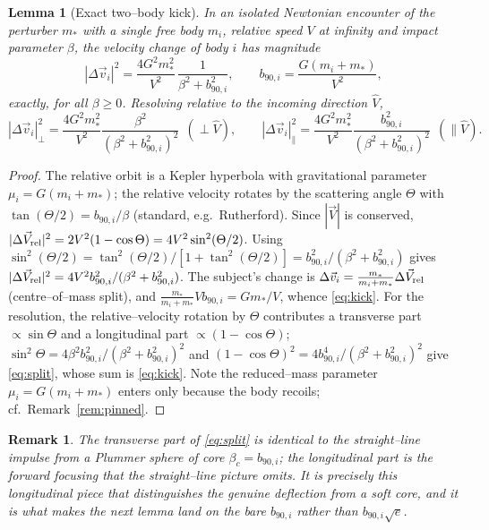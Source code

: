 \documentclass[11pt]{article}
\newcommand{\Vh}{\hat V}
\newtheorem{lemma}{Lemma}
\newtheorem{remark}{Remark}
\begin{document}
\begin{lemma}[Exact two--body kick]
\label{lem:kick}
In an isolated Newtonian encounter of the perturber $m_*$ with a single free body $m_i$, relative
speed $V$ at infinity and impact parameter $\beta$, the velocity change of body $i$ has magnitude
\begin{equation}
  |\Delta\vec v_i|^2=\frac{4G^2m_*^2}{V^2}\,\frac{1}{\beta^2+b_{90,i}^2},\qquad b_{90,i}=\frac{G(m_i+m_*)}{V^2},
  \label{eq:kick}
\end{equation}
exactly, for all $\beta\ge0$. Resolving relative to the incoming direction $\Vh$,
\begin{equation}
  |\Delta\vec v_i|^2_{\perp}=\frac{4G^2m_*^2}{V^2}\frac{\beta^2}{(\beta^2+b_{90,i}^2)^2}
  \ \ (\perp\Vh),\qquad
  |\Delta\vec v_i|^2_{\parallel}=\frac{4G^2m_*^2}{V^2}\frac{b_{90,i}^2}{(\beta^2+b_{90,i}^2)^2}
  \ \ (\parallel\Vh).
  \label{eq:split}
\end{equation}
\end{lemma}

\begin{proof}
The relative orbit is a Kepler hyperbola with gravitational parameter $\mu_i=G(m_i+m_*)$; the
relative velocity rotates by the scattering angle $\Theta$ with $\tan(\Theta/2)=b_{90,i}/\beta$
(standard, e.g.\ Rutherford). Since $|\vec V|$ is conserved,
$|\Delta\vec V_{\rm rel}|^2=2V^2(1-\cos\Theta)=4V^2\sin^2(\Theta/2)$. Using
$\sin^2(\Theta/2)=\tan^2(\Theta/2)/[1+\tan^2(\Theta/2)]=b_{90,i}^2/(\beta^2+b_{90,i}^2)$ gives
$|\Delta\vec V_{\rm rel}|^2=4V^2b_{90,i}^2/(\beta^2+b_{90,i}^2)$. The subject's change is
$\Delta\vec v_i=\frac{m_*}{m_i+m_*}\Delta\vec V_{\rm rel}$ (centre--of--mass split), and
$\frac{m_*}{m_i+m_*}Vb_{90,i}=Gm_*/V$, whence \eqref{eq:kick}. For the resolution, the
relative--velocity rotation by $\Theta$ contributes a transverse part $\propto\sin\Theta$ and a
longitudinal part $\propto(1-\cos\Theta)$;
$\sin^2\Theta=4\beta^2b_{90,i}^2/(\beta^2+b_{90,i}^2)^2$ and
$(1-\cos\Theta)^2=4b_{90,i}^4/(\beta^2+b_{90,i}^2)^2$ give \eqref{eq:split}, whose sum is
\eqref{eq:kick}. Note the reduced--mass parameter $\mu_i=G(m_i+m_*)$ enters only because the body
recoils; cf.\ Remark~\ref{rem:pinned}.
\end{proof}

\begin{remark}
The transverse part of \eqref{eq:split} is identical to the straight--line impulse from a Plummer
sphere of core $\beta_c=b_{90,i}$; the longitudinal part is the forward focusing that the
straight--line picture omits. It is precisely this longitudinal piece that distinguishes the genuine
deflection from a soft core, and it is what makes the next lemma land on the bare $b_{90,i}$ rather
than $b_{90,i}\sqrt e$.
\end{remark}
\end{document}
